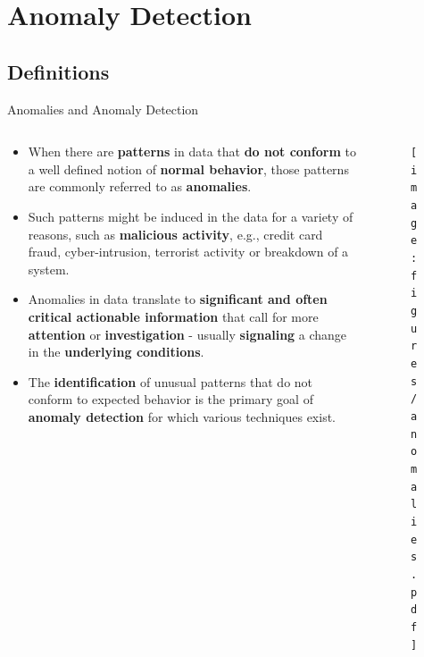 \documentclass[document.tex]{subfiles}
\begin{document}
    \section{Anomaly Detection}
    
    \subsection{Definitions}    

    \begin{frame}{Anomalies and Anomaly Detection}
        \begin{columns}
            \begin{column}{0.6\textwidth}
                \begin{itemize}
                    \item When there are \textbf{patterns} in data that \textbf{do not conform} to a well defined notion of \textbf{normal behavior}, those patterns are commonly referred to as \textbf{anomalies}.
                    \item Such patterns might be induced in the data for a variety of reasons, such as \textbf{malicious activity}, e.g., credit card fraud, cyber-intrusion, terrorist activity or breakdown of a system.
                    \item Anomalies in data translate to \textbf{significant and often critical actionable information} that call for more \textbf{attention} or \textbf{investigation} - usually \textbf{signaling} a change in the \textbf{underlying conditions}.
                    \item The \textbf{identification} of unusual patterns that do not conform to expected behavior is the primary goal of \textbf{anomaly detection} for which various techniques exist.
                \end{itemize}
            \end{column}
            \begin{column}{0.4\textwidth}
                \begin{figure}
                    \label{fig:anomalies}
                    \texttt{[image: figures/anomalies.pdf]}
                \end{figure}
            \end{column}
        \end{columns}
    \end{frame}
    
\end{document}
